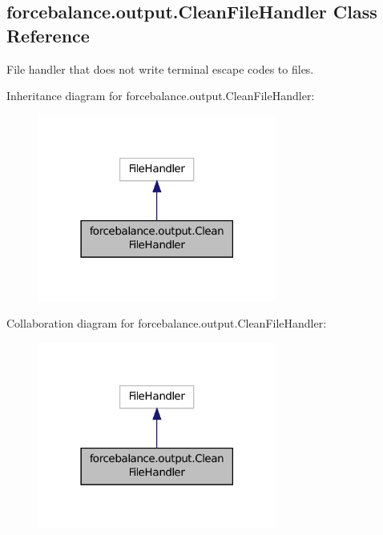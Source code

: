 \hypertarget{classforcebalance_1_1output_1_1CleanFileHandler}{\subsection{forcebalance.\-output.\-Clean\-File\-Handler Class Reference}
\label{classforcebalance_1_1output_1_1CleanFileHandler}
}


File handler that does not write terminal escape codes to files.  




Inheritance diagram for forcebalance.\-output.\-Clean\-File\-Handler\-:\nopagebreak
\begin{figure}[H]
\begin{center}
\leavevmode
\includegraphics[width=222pt]{classforcebalance_1_1output_1_1CleanFileHandler__inherit__graph}
\end{center}
\end{figure}


Collaboration diagram for forcebalance.\-output.\-Clean\-File\-Handler\-:\nopagebreak
\begin{figure}[H]
\begin{center}
\leavevmode
\includegraphics[width=222pt]{classforcebalance_1_1output_1_1CleanFileHandler__coll__graph}
\end{center}
\end{figure}
